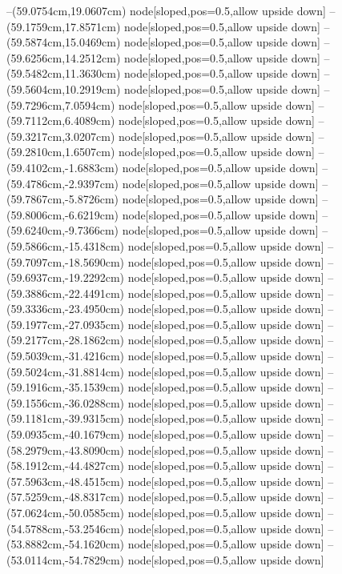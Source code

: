 --(59.0754cm,19.0607cm) node[sloped,pos=0.5,allow upside down]{\ArrowIn}
--(59.1759cm,17.8571cm) node[sloped,pos=0.5,allow upside down]{\ArrowIn}
--(59.5874cm,15.0469cm) node[sloped,pos=0.5,allow upside down]{\ArrowIn}
--(59.6256cm,14.2512cm) node[sloped,pos=0.5,allow upside down]{\arrowIn}
--(59.5482cm,11.3630cm) node[sloped,pos=0.5,allow upside down]{\ArrowIn}
--(59.5604cm,10.2919cm) node[sloped,pos=0.5,allow upside down]{\ArrowIn}
--(59.7296cm,7.0594cm) node[sloped,pos=0.5,allow upside down]{\ArrowIn}
--(59.7112cm,6.4089cm) node[sloped,pos=0.5,allow upside down]{\arrowIn}
--(59.3217cm,3.0207cm) node[sloped,pos=0.5,allow upside down]{\ArrowIn}
--(59.2810cm,1.6507cm) node[sloped,pos=0.5,allow upside down]{\ArrowIn}
--(59.4102cm,-1.6883cm) node[sloped,pos=0.5,allow upside down]{\ArrowIn}
--(59.4786cm,-2.9397cm) node[sloped,pos=0.5,allow upside down]{\ArrowIn}
--(59.7867cm,-5.8726cm) node[sloped,pos=0.5,allow upside down]{\ArrowIn}
--(59.8006cm,-6.6219cm) node[sloped,pos=0.5,allow upside down]{\arrowIn}
--(59.6240cm,-9.7366cm) node[sloped,pos=0.5,allow upside down]{\ArrowIn}
--(59.5866cm,-15.4318cm) node[sloped,pos=0.5,allow upside down]{\ArrowIn}
--(59.7097cm,-18.5690cm) node[sloped,pos=0.5,allow upside down]{\ArrowIn}
--(59.6937cm,-19.2292cm) node[sloped,pos=0.5,allow upside down]{\arrowIn}
--(59.3886cm,-22.4491cm) node[sloped,pos=0.5,allow upside down]{\ArrowIn}
--(59.3336cm,-23.4950cm) node[sloped,pos=0.5,allow upside down]{\ArrowIn}
--(59.1977cm,-27.0935cm) node[sloped,pos=0.5,allow upside down]{\ArrowIn}
--(59.2177cm,-28.1862cm) node[sloped,pos=0.5,allow upside down]{\ArrowIn}
--(59.5039cm,-31.4216cm) node[sloped,pos=0.5,allow upside down]{\ArrowIn}
--(59.5024cm,-31.8814cm) node[sloped,pos=0.5,allow upside down]{\arrowIn}
--(59.1916cm,-35.1539cm) node[sloped,pos=0.5,allow upside down]{\ArrowIn}
--(59.1556cm,-36.0288cm) node[sloped,pos=0.5,allow upside down]{\arrowIn}
--(59.1181cm,-39.9315cm) node[sloped,pos=0.5,allow upside down]{\ArrowIn}
--(59.0935cm,-40.1679cm) node[sloped,pos=0.5,allow upside down]{\arrowIn}
--(58.2979cm,-43.8090cm) node[sloped,pos=0.5,allow upside down]{\ArrowIn}
--(58.1912cm,-44.4827cm) node[sloped,pos=0.5,allow upside down]{\arrowIn}
--(57.5963cm,-48.4515cm) node[sloped,pos=0.5,allow upside down]{\ArrowIn}
--(57.5259cm,-48.8317cm) node[sloped,pos=0.5,allow upside down]{\arrowIn}
--(57.0624cm,-50.0585cm) node[sloped,pos=0.5,allow upside down]{\ArrowIn}
--(54.5788cm,-53.2546cm) node[sloped,pos=0.5,allow upside down]{\ArrowIn}
--(53.8882cm,-54.1620cm) node[sloped,pos=0.5,allow upside down]{\ArrowIn}
--(53.0114cm,-54.7829cm) node[sloped,pos=0.5,allow upside down]{\ArrowIn}
